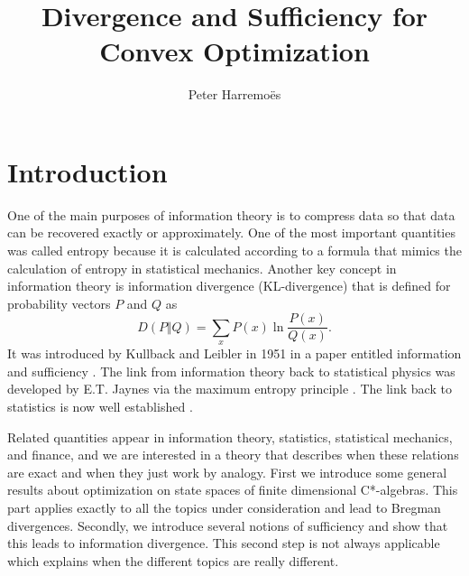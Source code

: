 \documentclass[10pt,a4paper,draft]{article}
\begin{document}
\title{Divergence and Sufficiency for Convex Optimization}
\author{Peter Harremo{\" e}s}
\maketitle


\section{Introduction}

One of the main purposes of information theory is to compress
data so that data can be recovered exactly or approximately. One of
the most important quantities was called entropy because it is
calculated according to a formula that mimics the calculation of entropy in
statistical mechanics. Another key concept in information theory is
information divergence (KL-divergence) that is defined for probability vectors $P$ and $Q$ as
\[
D\left(P\Vert Q\right)=\sum_x P(x)\ln\frac{P(x)}{Q(x)}.
\]
It was introduced by Kullback and
Leibler in 1951 in a paper entitled information and sufficiency
\cite{Kullback1951}. The link
from information theory back to statistical physics was
developed by E.T. Jaynes via the maximum entropy principle \cite{Jaynes1957,Jaynes1989}. The link back
to statistics is now well established
\cite{Liese1987,Barron1998,Csiszar2004,Grunwald2004a,Grunwald2007}.

Related quantities appear in information theory, statistics,
statistical mechanics, and finance, and we are interested in a
theory that describes when these relations are exact and when they just work by
analogy. First we introduce some general results about optimization on
state spaces of finite dimensional C*-algebras. This part applies exactly to all the topics under
consideration and lead to Bregman divergences. Secondly, we introduce several notions of
sufficiency and show that this leads to information divergence.
This second step is not always applicable which explains when the
different topics are really different.
\end{document}
